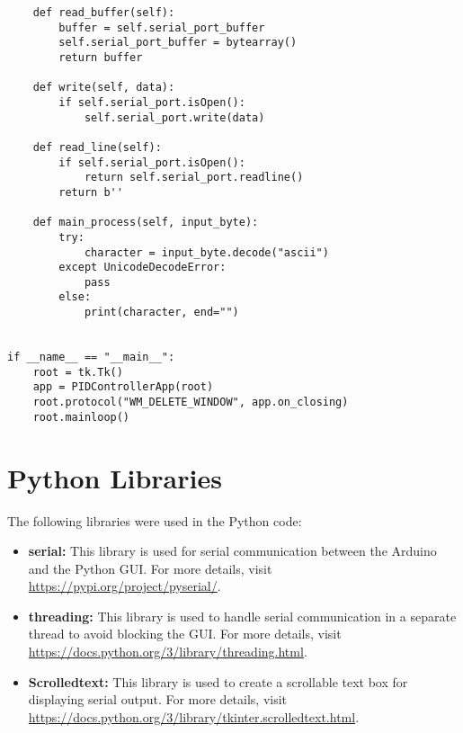 \documentclass{article}
\begin{document}
\begin{verbatim}
    def read_buffer(self):
        buffer = self.serial_port_buffer
        self.serial_port_buffer = bytearray()
        return buffer

    def write(self, data):
        if self.serial_port.isOpen():
            self.serial_port.write(data)

    def read_line(self):
        if self.serial_port.isOpen():
            return self.serial_port.readline()
        return b''

    def main_process(self, input_byte):
        try:
            character = input_byte.decode("ascii")
        except UnicodeDecodeError:
            pass
        else:
            print(character, end="")


if __name__ == "__main__":
    root = tk.Tk()
    app = PIDControllerApp(root)
    root.protocol("WM_DELETE_WINDOW", app.on_closing)
    root.mainloop()
\end{verbatim}

\section{Python Libraries}
The following libraries were used in the Python code:
\begin{itemize}
    \item \textbf{serial:} This library is used for serial communication between the Arduino and the Python GUI. For more details, visit \url{https://pypi.org/project/pyserial/}.
    \item \textbf{threading:} This library is used to handle serial communication in a separate thread to avoid blocking the GUI. For more details, visit \url{https://docs.python.org/3/library/threading.html}.
    \item \textbf{Scrolledtext:} This library is used to create a scrollable text box for displaying serial output. For more details, visit \url{https://docs.python.org/3/library/tkinter.scrolledtext.html}.
\end{itemize}
\end{document}
